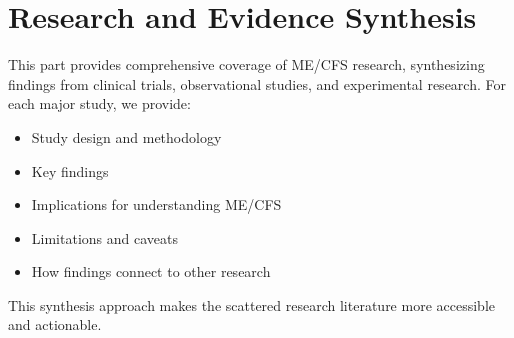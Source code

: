 \part{Research and Evidence Synthesis}
\label{part:research}

This part provides comprehensive coverage of ME/CFS research, synthesizing findings from clinical trials, observational studies, and experimental research. For each major study, we provide:

\begin{itemize}
\item Study design and methodology
\item Key findings
\item Implications for understanding ME/CFS
\item Limitations and caveats
\item How findings connect to other research
\end{itemize}

This synthesis approach makes the scattered research literature more accessible and actionable.

